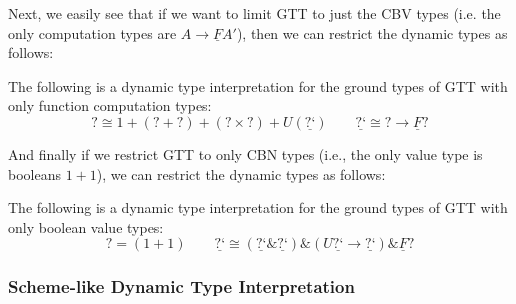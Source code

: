 \documentclass[acmsmall,screen,12pt]{acmart}
\renewcommand{\u}{\underline}
\newcommand{\dynv}{{?}}
\newcommand{\dync}{\u {\text{?`}}}
\newcommand{\with}{\mathbin{\&}}
\begin{document}
\begin{longonly}
Next, we easily see that if we want to limit GTT to just the CBV types
(i.e. the only computation types are $A \to \u F A'$), then we can
restrict the dynamic types as follows:
\begin{definition}
  The following is a dynamic type interpretation for the ground types of
  GTT with only function computation types:
  \[
    \dynv \cong 1 + (\dynv + \dynv) + (\dynv \times \dynv) + U(\dync) \qquad
    \dync \cong \dynv \to \u F \dynv
  \]
\end{definition}

And finally if we restrict GTT to only CBN types (i.e., the only value
type is booleans $1+1$), we can restrict the dynamic types as follows:
\begin{definition}
  The following is a dynamic type interpretation for the ground types of
  GTT with only boolean value types:
  \[
    \dynv = (1 + 1) \qquad
    \dync \cong (\dync \with \dync) \with (U\dync \to \dync)
    \with \u F \dynv
  \]
\end{definition}
\end{longonly}

\subsubsection{Scheme-like Dynamic Type Interpretation}
\end{document}
